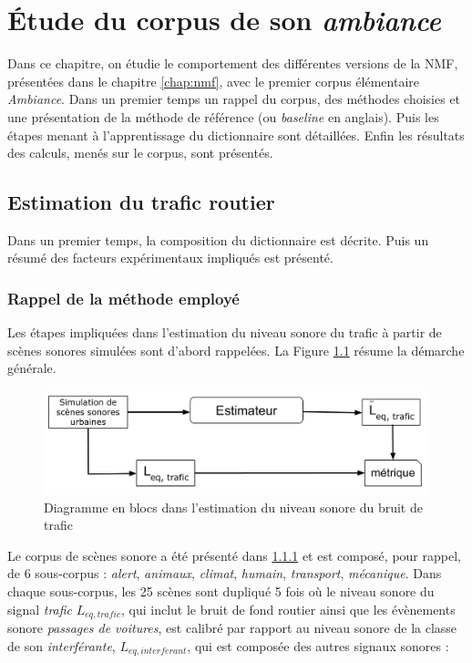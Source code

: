 
\chapter{\'Etude du corpus de son \textit{ambiance}}
\label{chap:ambiance}
Dans ce chapitre, on étudie le comportement des différentes versions de la NMF, présentées dans le chapitre \ref{chap:nmf},  avec le premier corpus élémentaire \textit{Ambiance}. 
Dans un premier temps un rappel du corpus, des méthodes choisies et une présentation de la méthode de référence (ou \textit{baseline} en anglais). Puis les étapes menant à l'apprentissage du dictionnaire sont détaillées. Enfin les résultats des calculs, menés sur le corpus, sont présentés.


\section{Estimation du trafic routier}
Dans un premier temps, la composition du dictionnaire est décrite. Puis un résumé des facteurs expérimentaux impliqués est présenté.
\subsection{Rappel de la méthode employé}

Les étapes impliquées dans l'estimation du niveau sonore du trafic à partir de scènes sonores simulées sont d'abord rappelées. La Figure \ref{fig:rappel_estimateur} résume la démarche générale.

\begin{figure}[ht]
\centering
\includegraphics[width=.8\linewidth]{./figures/NMF/Bloc_diagram_estimateur_FR.pdf}
\caption{Diagramme en blocs dans l'estimation du niveau sonore du bruit de trafic}
\label{fig:rappel_estimateur}
\end{figure}

Le corpus de scènes sonore a été présenté dans \ref{} et est composé, pour rappel, de 6 sous-corpus : \textit{alert}, \textit{animaux}, \textit{climat}, \textit{humain}, \textit{transport}, \textit{mécanique}. Dans chaque sous-corpus, les 25 scènes sont dupliqué 5 fois où le niveau sonore du signal \textit{trafic} $L_{eq,trafic}$, qui inclut le bruit de fond routier ainsi que les évènements sonore \textit{passages de voitures}, est calibré par rapport au niveau sonore de la classe de son \textit{interférante}, $L_{eq,interferant}$, qui est composée des autres signaux sonores : 

